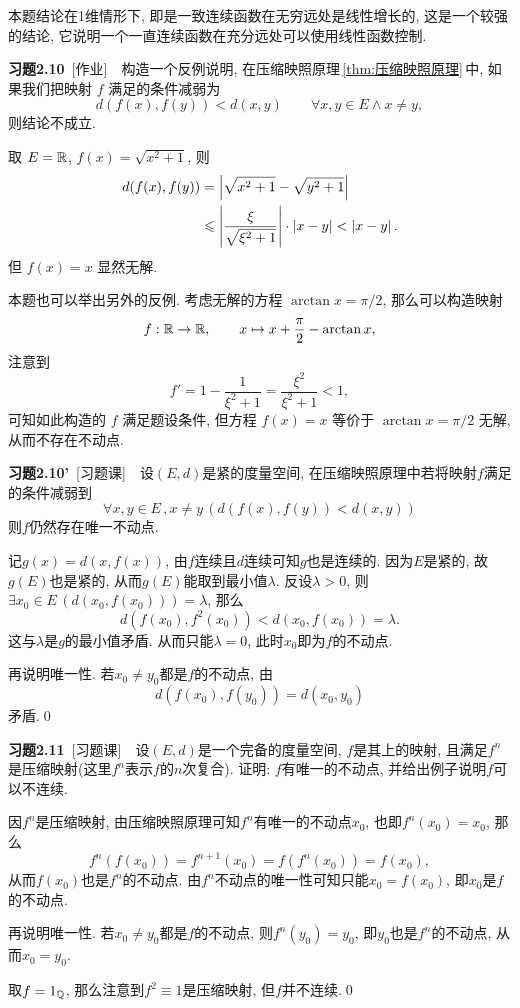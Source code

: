 	\begin{Remark}
		本题结论在1维情形下, 即是一致连续函数在无穷远处是线性增长的, 这是一个较强的结论, 它说明一个一直连续函数在充分远处可以使用线性函数控制.
	\end{Remark}
	
	\textbf{习题2.10}\ [作业]\ \ 构造一个反例说明, 在压缩映照原理\,\ref{thm:压缩映照原理}\,中, 如果我们把映射 $ f $ 满足的条件减弱为
	\[
		d(f(x), f(y))<d(x, y)\qquad \forall x, y\in E\wedge x\neq y,
	\]
	则结论不成立.

	\begin{Solution}
		取 $ E=\mathbb{R} $, $ f(x)=\sqrt{x^{2}+1} $, 则
		\[
			\begin{aligned}
				d(f(x), f(y)) & =\left| \sqrt{x^{2}+1}-\sqrt{y^{2}+1} \right| \\
				& \leqslant\left| \frac{\xi}{\sqrt{\xi^{2}+1}} \right| \cdot\left| x-y \right| <\left| x-y \right| .
			\end{aligned}
		\]
		但 $ f(x)=x $ 显然无解.
	\end{Solution}
	\begin{Remark}
		本题也可以举出另外的反例. 考虑无解的方程 $ \arctan x=\pi/2 $, 那么可以构造映射
		\[
			f : \mathbb{R}\to\mathbb{R},\qquad x\mapsto x+\frac\pi 2-\arctan x,
		\]
		注意到
		\[
			f'=1-\frac{1}{\xi^2+1}=\frac{\xi^2}{\xi^2+1}<1,
		\]
		可知如此构造的 $ f $ 满足题设条件, 但方程 $ f(x)=x $ 等价于 $ \arctan x=\pi/2 $ 无解, 从而不存在不动点.
	\end{Remark}
	
	\textbf{习题2.10'}\ [习题课]\ \ 设$ (E,d) $是紧的度量空间, 在压缩映照原理中若将映射$ f $满足的条件减弱到
	\[
	\forall x,y\in E\,,x\ne y\,(d(f(x),f(y))<d(x,y))
	\]
	则$ f $仍然存在唯一不动点.
	\begin{Proof}
	记$ g(x)=d(x,f(x)) $, 由$ f $连续且$ d $连续可知$ g $也是连续的. 因为$ E $是紧的, 故$ g(E) $也是紧的, 从而$ g(E) $能取到最小值$ \lambda $. 反设$ \lambda>0 $, 则$ \exists x_0\in E\,(d(x_0,f(x_0)))=\lambda $, 那么
	\[
	d(f(x_0),f^2(x_0))<d(x_0,f(x_0))=\lambda.
	\]
	这与$ \lambda $是$ g $的最小值矛盾. 从而只能$ \lambda=0 $, 此时$ x_0 $即为$ f $的不动点.
	
	再说明唯一性. 若$ x_0\ne y_0 $都是$ f $的不动点, 由
	\[
	d(f(x_0),f(y_0))=d(x_0,y_0)
	\]
	矛盾.\qed
	\end{Proof}
	
	\textbf{习题2.11}\ [习题课]\ \ 设$ (E,d) $是一个完备的度量空间, $ f $是其上的映射, 且满足$ f^n $是压缩映射(这里$ f^n $表示$ f $的$ n $次复合). 证明: $ f $有唯一的不动点, 并给出例子说明$ f $可以不连续.
	\begin{Proof}
	因$ f^n $是压缩映射, 由压缩映照原理可知$ f^n $有唯一的不动点$ x_0 $, 也即$ f^n(x_0)=x_0 $, 那么
	\[
	f^n(f(x_0))=f^{n+1}(x_0)=f(f^n(x_0))=f(x_0),
	\]
	从而$ f(x_0) $也是$ f^n $的不动点. 由$ f^n $不动点的唯一性可知只能$ x_0=f(x_0) $, 即$ x_0 $是$ f $的不动点.
	
	再说明唯一性. 若$ x_0\ne y_0 $都是$ f $的不动点, 则$ f^n(y_0)=y_0 $, 即$ y_0 $也是$ f^n $的不动点, 从而$ x_0=y_0 $.
	
	取$ f=1_{\mathbb{Q}} $, 那么注意到$ f^2\equiv 1 $是压缩映射, 但$ f $并不连续.\qed
	\end{Proof}
	
